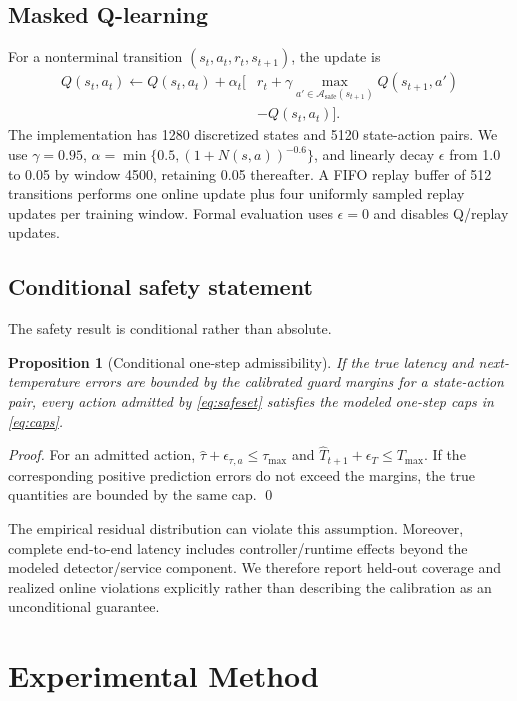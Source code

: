 \documentclass[journal]{IEEEtran}
\newtheorem{proposition}{Proposition}
\newcommand{\Asafe}{\mathcal{A}_{\mathrm{safe}}}
\begin{document}
\subsection{Masked Q-learning}
For a nonterminal transition $(s_t,a_t,r_t,s_{t+1})$, the update is
\begin{equation}
\begin{split}
Q(s_t,a_t)\leftarrow Q(s_t,a_t)+\alpha_t\big[&r_t+\gamma \max_{a'\in\Asafe(s_{t+1})}Q(s_{t+1},a')\\
&-Q(s_t,a_t)\big].
\end{split}
\label{eq:q}
\end{equation}
The implementation has 1280 discretized states and 5120 state-action pairs. We use $\gamma=0.95$, $\alpha=\min\{0.5,(1+N(s,a))^{-0.6}\}$, and linearly decay $\epsilon$ from 1.0 to 0.05 by window 4500, retaining 0.05 thereafter. A FIFO replay buffer of 512 transitions performs one online update plus four uniformly sampled replay updates per training window. Formal evaluation uses $\epsilon=0$ and disables Q/replay updates.

\subsection{Conditional safety statement}
The safety result is conditional rather than absolute.
\begin{proposition}[Conditional one-step admissibility]
If the true latency and next-temperature errors are bounded by the calibrated guard margins for a state-action pair, every action admitted by \eqref{eq:safeset} satisfies the modeled one-step caps in \eqref{eq:caps}.
\end{proposition}
\begin{proof}
For an admitted action, $\widehat{\tau}+\epsilon_{\tau,a}\le\tau_{\max}$ and $\widehat{T}_{t+1}+\epsilon_T\le T_{\max}$. If the corresponding positive prediction errors do not exceed the margins, the true quantities are bounded by the same cap. \qed
\end{proof}
The empirical residual distribution can violate this assumption. Moreover, complete end-to-end latency includes controller/runtime effects beyond the modeled detector/service component. We therefore report held-out coverage and realized online violations explicitly rather than describing the calibration as an unconditional guarantee.

\section{Experimental Method}
\end{document}
